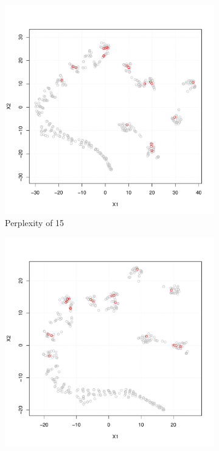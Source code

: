 \documentclass[a4paper, 12pt]{article}
\begin{document}
    \begin{figure}[H]
        \centering
        \begin{subfigure}{0.49\textwidth}
            \includegraphics[width = \textwidth]{resources/pdf/tSNE_15.pdf}
            \caption{Perplexity of 15}
            \vspace{1em}
        \end{subfigure}
        \begin{subfigure}{0.49\textwidth}
            \includegraphics[width = \textwidth]{resources/pdf/tSNE_20.pdf}

\end{subfigure}
\end{figure}
\end{document}
